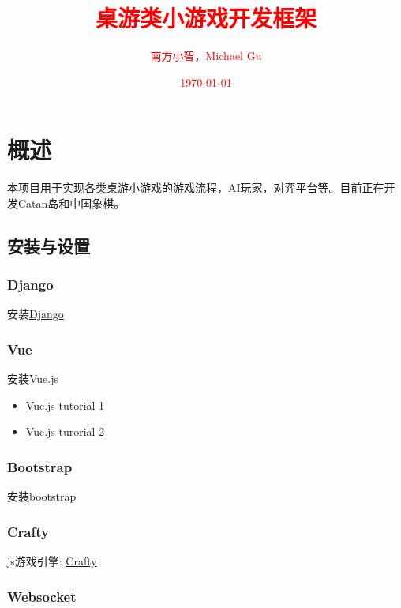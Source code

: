 \documentclass[export, 12pt, letterpaper]{ctexrep}
\title{\fontsize{40}{20} \textbf{\textcolor{red}{\kaishu 桌游类小游戏开发框架}}}
\author{\textcolor{red}{南方小智，Michael Gu}}
\date{\textcolor{red}{\today}}
\begin{document}
\maketitle
\thispagestyle{empty}
\newpage

\setcounter{page}{1}
\tableofcontents
\newpage



\chapter{概述}

本项目用于实现各类桌游小游戏的游戏流程，AI玩家，对弈平台等。目前正在开发Catan岛和中国象棋。

\section{安装与设置}

\subsection{Django}
安装\href{https://www.djangoproject.com/}{Django}


\subsection{Vue}
安装Vue.js


\begin{itemize}
\item{ \href{https://www.youtube.com/watch?v=bI5jpueiCWw\&t=756s}{Vue.js tutorial 1} }
\item{ \href{https://www.youtube.com/watch?v=xq532yn8gMA\&t=2608s}{Vue.js turorial 2} }
\end{itemize}


\subsection{Bootstrap}

安装bootstrap

\subsection{Crafty}
js游戏引擎: \href{https://github.com/craftyjs/Crafty}{Crafty}

\subsection{Websocket}
\end{document}
